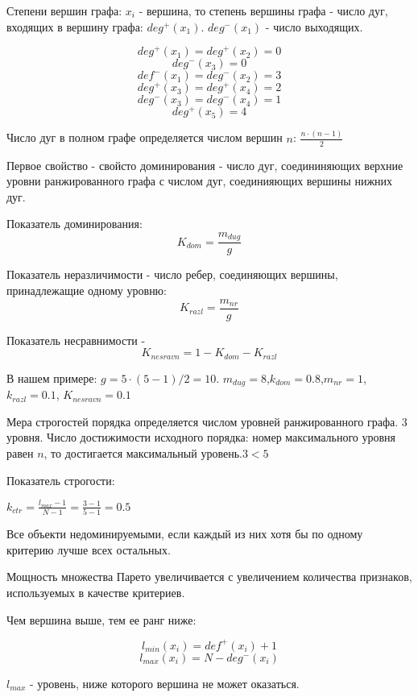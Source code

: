 \documentclass[aps,%
12pt,%
final,%
oneside,
onecolumn,%
musixtex, %
superscriptaddress,%
centertags]{article} %
\begin{document}
Степени вершин графа: $x_i$ - вершина, то степень вершины графа - число дуг, входящих в вершину графа: $deg^+(x_1)$. $deg^-(x_1)$ - число выходящих.

$$deg^+(x_1) = deg^+(x_2) = 0$$
$$deg^-(x_3)=0$$
$$def^-(x_1) = deg^-(x_2) = 3$$
$$deg^+(x_3) = deg^+(x_4) = 2$$
$$deg^-(x_3) = deg^-(x_4) = 1$$
$$deg^+(x_5) = 4$$

Число дуг в полном графе определяется числом вершин $n$: $\frac{n \cdot (n-1)}{2} $

Первое свойство - свойсто доминирования - число дуг, соедининяющих верхние уровни ранжированного графа с числом дуг, соединияющих вершины нижних дуг.

Показатель доминирования: 
$$ K_{dom} = \frac{m_{dug}}{g}$$

Показатель неразличимости  - число ребер, соединяющих вершины, принадлежащие одному уровню:
$$ K_{razl} = \frac{m_{nr}}{g}$$

Показатель несравнимости - 
$$ K_{nesravn} = 1 - K_{dom} - K_{razl}$$

В нашем примере: $g = 5 \cdot (5-1) /2 = 10$.  $m_{dug} = 8$,$k_{dom} =0.8$,$m_{nr} = 1$,$k_{razl} =0.1$, $ K_{nesravn} = 0.1$

Мера строгостей порядка определяется числом уровней ранжированного графа. 3 уровня.
Число достижимости исходного порядка: номер максимального уровня равен $n$, то достигается максимальный уровень.$3<5$

Показатель строгости:

$k_{ctr} = \frac{l_{max}-1}{N-1} = \frac{3-1}{5-1} = 0.5$

Все объекти недоминируемыми, если каждый из них хотя бы по одному критерию лучше всех остальных.

Мощность множества Парето увеличивается с увеличением количества признаков, используемых в качестве критериев.

Чем вершина выше, тем ее ранг ниже:

$$l_{min}(x_i) = def^+(x_i) + 1$$
$$l_{max}(x_i) =N -  deg^-(x_i)$$ 

$l_{max}$ - уровень, ниже которого вершина не может оказаться.
\end{document}

